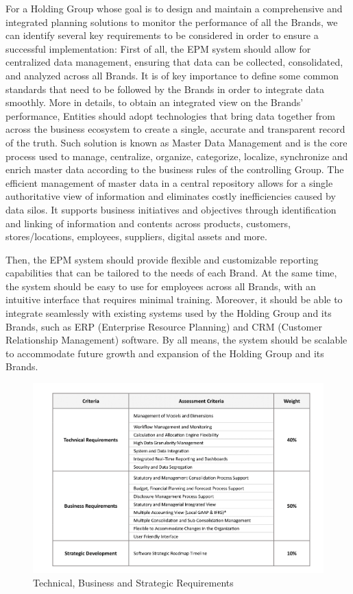 \documentclass[12pt,a4paper,openright,twoside]{book}
\begin{document}
For a Holding Group whose goal is to design and maintain a comprehensive and integrated planning solutions to monitor the performance of all the Brands, we can identify several key requirements to be considered in order to ensure a successful implementation:
%
First of all, the EPM system should allow for centralized data management, ensuring that data can be collected, consolidated, and analyzed across all Brands.
%
It is of key importance to define some common standards that need to be followed by the Brands in order to integrate data smoothly.
%
More in details, to obtain an integrated view on the Brands' performance, Entities should adopt technologies that bring data together from across the business ecosystem to create a single, accurate and transparent record of the truth.
%
Such solution is known as Master Data Management and is the core process used to manage, centralize, organize, categorize, localize, synchronize and enrich master data according to the business rules of the controlling Group.
%
The efficient management of master data in a central repository allows for a single authoritative view of information and eliminates costly inefficiencies caused by data silos.
%
It supports business initiatives and objectives through identification and linking of information and contents across products, customers, stores/locations, employees, suppliers, digital assets and more.

Then, the EPM system should provide flexible and customizable reporting capabilities that can be tailored to the needs of each Brand.
%
At the same time, the system should be easy to use for employees across all Brands, with an intuitive interface that requires minimal training.
%
Moreover, it should be able to integrate seamlessly with existing systems used by the Holding Group and its Brands, such as ERP (Enterprise Resource Planning) and CRM (Customer Relationship Management) software.
%
By all means, the system should be scalable to accommodate future growth and expansion of the Holding Group and its Brands.

\begin{figure}[ht]
	\centering
	\includegraphics[width=\linewidth]{figures/requirements.pdf}
	\caption{Technical, Business and Strategic Requirements}
	\label{fig:requirements}
\end{figure}
\end{document}
